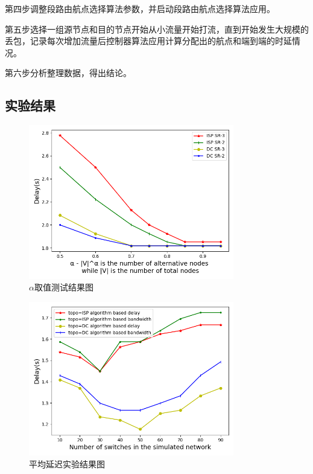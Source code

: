 第四步调整段路由航点选择算法参数，并启动段路由航点选择算法应用。

第五步选择一组源节点和目的节点开始从小流量开始打流，直到开始发生大规模的丢包，记录每次增加流量后控制器算法应用计算分配出的航点和端到端的时延情况。

第六步分析整理数据，得出结论。

\subsection{实验结果}

\begin{figure}[htbp]
\setlength{\abovecaptionskip}{15pt plus 3pt minus 2pt}
\centerline{\includegraphics[width=0.8\textwidth]{./figures/ch3-test-1.png}}
\caption{$\alpha$取值测试结果图}
\label{fig-ch3-test-1}
\end{figure}

\begin{figure}[htbp]
\setlength{\abovecaptionskip}{15pt plus 3pt minus 2pt}
\centerline{\includegraphics[width=0.8\textwidth]{./figures/ch3-test-2.png}}
\caption{平均延迟实验结果图}
\label{fig-ch3-test-2}
\end{figure}


